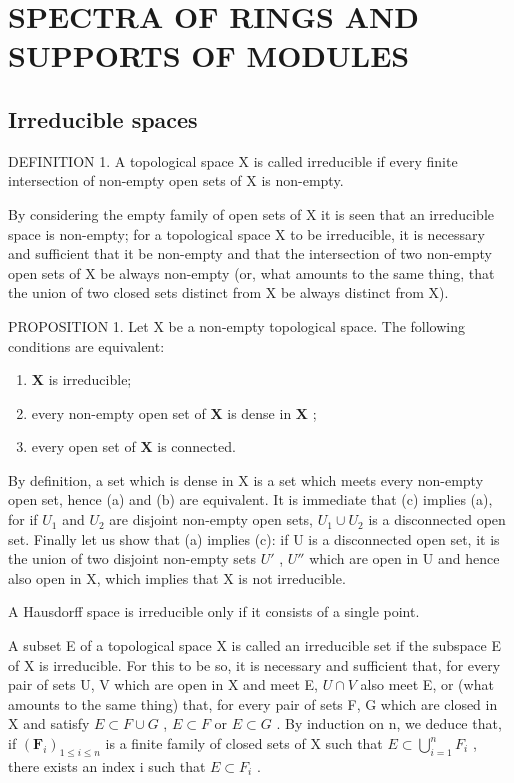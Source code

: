 \section{SPECTRA OF RINGS AND SUPPORTS OF MODULES}

\subsection{Irreducible spaces}

DEFINITION 1. A topological space X is called irreducible if every finite intersection of non-empty open sets of X is non-empty.

By considering the empty family of open sets of X it is seen that an irreducible space is non-empty; for a topological space X to be irreducible, it is necessary and sufficient that it be non-empty and that the intersection of two non-empty open sets of X be always non-empty (or, what amounts to the same thing, that the union of two closed sets distinct from X be always distinct from X).

PROPOSITION 1. Let X be a non-empty topological space. The following conditions are equivalent:

\begin{enumerate}
\def\labelenumi{(\alph{enumi})}
\item
  \(\mathbf{X}\) is irreducible;
\item
  every non-empty open set of \(\mathbf{X}\) is dense in \(\mathbf{X}\) ;
\item
  every open set of \(\mathbf{X}\) is connected.
\end{enumerate}

By definition, a set which is dense in X is a set which meets every non-empty open set, hence (a) and (b) are equivalent. It is immediate that (c) implies (a), for if \(U_{1}\) and \(U_{2}\) are disjoint non-empty open sets, \(U_{1} \cup U_{2}\) is a disconnected open set. Finally let us show that (a) implies (c): if U is a disconnected open set, it is the union of two disjoint non-empty sets \(U'\) , \(U''\) which are open in U and hence also open in X, which implies that X is not irreducible.

A Hausdorff space is irreducible only if it consists of a single point.

A subset E of a topological space X is called an irreducible set if the subspace E of X is irreducible. For this to be so, it is necessary and sufficient that, for every pair of sets U, V which are open in X and meet E, \(U \cap V\) also meet E, or (what amounts to the same thing) that, for every pair of sets F, G which are closed in X and satisfy \(E \subset F \cup G\) , \(E \subset F\) or \(E \subset G\) . By induction on n, we deduce that, if \((\mathbf{F}_{i})_{1 \leq i \leq n}\) is a finite family of closed sets of X such that \(E \subset \bigcup_{i=1}^{n} F_{i}\) , there exists an index i such that \(E \subset F_{i}\) .

